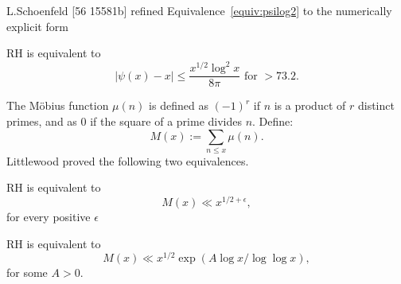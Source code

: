 \documentclass[12pt,letterpaper, reqno]{aimpl}
\begin{document}
\begin{problemblock} L.Schoenfeld [56 15581b] refined
Equivalence~\ref{equiv:psilog2} to the numerically explicit form
\begin{rhequivalence}[2.17]
RH is equivalent to
$$
|\psi (x) -x| \leq \frac{x^{1/2}\log^2x}{8\pi} \text{ for } > 73.2.
$$
\end{rhequivalence}
\end{problemblock}

\begin{problemblock}
The M\"obius function $\mu (n)$ is defined as $(-1)^r$ if
$n$ is a product of $r$ distinct primes, and as $0$ if the
square of a prime divides $n$. Define:
$$
M(x) := \sum_{n \leq x} \mu (n).
$$
Littlewood proved the following two equivalences.

\begin{rhequivalence}[2.2]\label{equiv:mobius_sum}
RH is equivalent to
$$
M (x) \ll x^{1/2 + \epsilon},
$$
for every positive $\epsilon$
\end{rhequivalence}
\end{problemblock}

\begin{rhequiv}[2.25]
RH is equivalent to
$$
M (x) \ll x^{1/2} \exp (A \log x/\log\log x),
$$
for some $A>0$.
\end{rhequiv}
\end{document}

